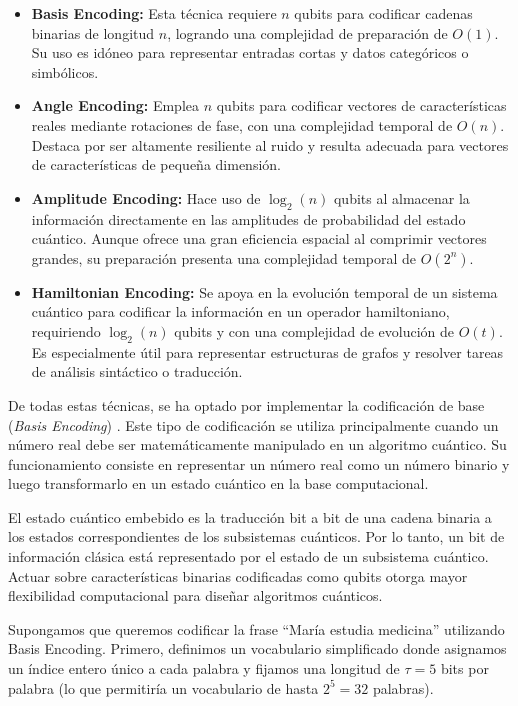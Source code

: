 \begin{itemize}
    \item \textbf{Basis Encoding:} Esta técnica requiere $n$ qubits para codificar cadenas binarias de longitud $n$, logrando una complejidad de preparación de $O(1)$. Su uso es idóneo para representar entradas cortas y datos categóricos o simbólicos.
    \item \textbf{Angle Encoding:} Emplea $n$ qubits para codificar vectores de características reales mediante rotaciones de fase, con una complejidad temporal de $O(n)$. Destaca por ser altamente resiliente al ruido y resulta adecuada para vectores de características de pequeña dimensión.
    \item \textbf{Amplitude Encoding:} Hace uso de $\log_2(n)$ qubits al almacenar la información directamente en las amplitudes de probabilidad del estado cuántico. Aunque ofrece una gran eficiencia espacial al comprimir vectores grandes, su preparación presenta una complejidad temporal de $O(2^n)$.
    \item \textbf{Hamiltonian Encoding:} Se apoya en la evolución temporal de un sistema cuántico para codificar la información en un operador hamiltoniano, requiriendo $\log_2(n)$ qubits y con una complejidad de evolución de $O(t)$. Es especialmente útil para representar estructuras de grafos y resolver tareas de análisis sintáctico o traducción.
\end{itemize}

De todas estas técnicas, se ha optado por implementar la codificación de base (\textit{Basis Encoding}) \cite{quantumzeitgeist_encoding_overview}. Este tipo de codificación se utiliza principalmente cuando un número real debe ser matemáticamente manipulado en un algoritmo cuántico. Su funcionamiento consiste en representar un número real como un número binario y luego transformarlo en un estado cuántico en la base computacional.

El estado cuántico embebido es la traducción bit a bit de una cadena binaria a los estados correspondientes de los subsistemas cuánticos. Por lo tanto, un bit de información clásica está representado por el estado de un subsistema cuántico. Actuar sobre características binarias codificadas como qubits otorga mayor flexibilidad computacional para diseñar algoritmos cuánticos.

Supongamos que queremos codificar la frase ``María estudia medicina'' utilizando Basis Encoding. Primero, definimos un vocabulario simplificado donde asignamos un índice entero único a cada palabra y fijamos una longitud de $\tau = 5$ bits por palabra (lo que permitiría un vocabulario de hasta $2^5 = 32$ palabras).

